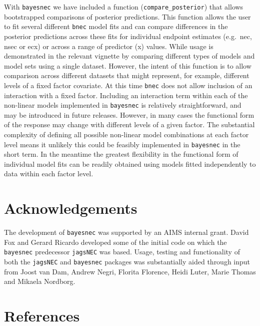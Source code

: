 \documentclass[10pt,a4paper,onecolumn]{article}
\begin{document}
With \texttt{bayesnec} we have included a function
(\texttt{compare\_posterior}) that allows bootstrapped comparisons of
posterior predictions. This function allows the user to fit several
different \texttt{bnec} model fits and can compare differences in the
posterior predictions across these fits for individual endpoint
estimates (e.g.~nec, nsec or ecx) or across a range of predictor (x)
values. While usage is demonstrated in the relevant vignette by
comparing different types of models and model sets using a single
dataset. However, the intent of this function is to allow comparison
across different datasets that might represent, for example, different
levels of a fixed factor covariate. At this time \texttt{bnec} does not
allow inclusion of an interaction with a fixed factor. Including an
interaction term within each of the non-linear models implemented in
\texttt{bayesnec} is relatively straightforward, and may be introduced
in future releases. However, in many cases the functional form of the
response may change with different levels of a given factor. The
substantial complexity of defining all possible non-linear model
combinations at each factor level means it unlikely this could be
feasibly implemented in \texttt{bayesnec} in the short term. In the
meantime the greatest flexibility in the functional form of individual
model fits can be readily obtained using models fitted independently to
data within each factor level.

\hypertarget{acknowledgements}{%
\section{Acknowledgements}\label{acknowledgements}}

The development of \texttt{bayesnec} was supported by an AIMS internal
grant. David Fox and Gerard Ricardo developed some of the initial code
on which the \texttt{bayesnec} predecessor \texttt{jagsNEC} was based.
Usage, testing and functionality of both the \texttt{jagsNEC} and
\texttt{bayesnec} packages was substantially aided through input from
Joost van Dam, Andrew Negri, Florita Florence, Heidi Luter, Marie Thomas
and Mikaela Nordborg.

\hypertarget{references}{%
\section*{References}\label{references}}
\end{document}
